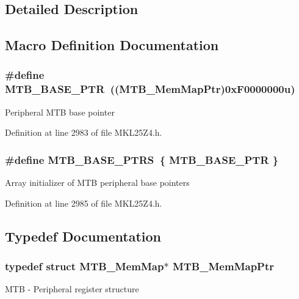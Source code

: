 \subsection{Detailed Description}


\subsection{Macro Definition Documentation}
\subsubsection[{\texorpdfstring{M\+T\+B\+\_\+\+B\+A\+S\+E\+\_\+\+P\+TR}{MTB_BASE_PTR}}]{\setlength{\rightskip}{0pt plus 5cm}\#define M\+T\+B\+\_\+\+B\+A\+S\+E\+\_\+\+P\+TR~(({\bf M\+T\+B\+\_\+\+Mem\+Map\+Ptr})0x\+F0000000u)}\hypertarget{group___m_t_b___peripheral_gadf7f362dfa67354951e6a23ddf08cd73}{}\label{group___m_t_b___peripheral_gadf7f362dfa67354951e6a23ddf08cd73}
Peripheral M\+TB base pointer 

Definition at line 2983 of file M\+K\+L25\+Z4.\+h.

\subsubsection[{\texorpdfstring{M\+T\+B\+\_\+\+B\+A\+S\+E\+\_\+\+P\+T\+RS}{MTB_BASE_PTRS}}]{\setlength{\rightskip}{0pt plus 5cm}\#define M\+T\+B\+\_\+\+B\+A\+S\+E\+\_\+\+P\+T\+RS~\{ {\bf M\+T\+B\+\_\+\+B\+A\+S\+E\+\_\+\+P\+TR} \}}\hypertarget{group___m_t_b___peripheral_ga45b3138a9794fd8f2c7613b48646e44f}{}\label{group___m_t_b___peripheral_ga45b3138a9794fd8f2c7613b48646e44f}
Array initializer of M\+TB peripheral base pointers 

Definition at line 2985 of file M\+K\+L25\+Z4.\+h.



\subsection{Typedef Documentation}
\subsubsection[{\texorpdfstring{M\+T\+B\+\_\+\+Mem\+Map\+Ptr}{MTB_MemMapPtr}}]{\setlength{\rightskip}{0pt plus 5cm}typedef struct {\bf M\+T\+B\+\_\+\+Mem\+Map}$\ast$ {\bf M\+T\+B\+\_\+\+Mem\+Map\+Ptr}}\hypertarget{group___m_t_b___peripheral_ga2d3d13148d5c08e92b1ad2eeb14342da}{}\label{group___m_t_b___peripheral_ga2d3d13148d5c08e92b1ad2eeb14342da}
M\+TB -\/ Peripheral register structure 